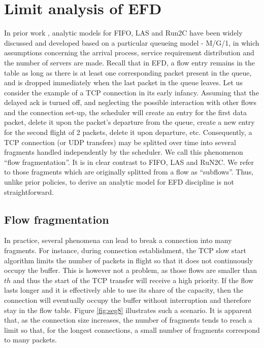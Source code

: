 \documentclass[preprint,12pt]{elsarticle}
\begin{document}
\section{Limit analysis of EFD}
\label{sec:analysis_efd}
In prior work \cite{kleinrock_76_queueing,Avrachenkov04Run2c}, analytic models for FIFO, LAS and Run2C have been widely discussed and developed based on a particular queueing model - M/G/1, in which assumptions concerning the arrival process, service requirement distribution and the number of servers are made. Recall that in EFD, a flow entry remains in the table as long as there is at least one corresponding packet present in the queue, and is dropped immediately when the last packet in the queue leaves. Let us consider the example of a TCP connection in its early infancy. Assuming that the delayed ack is turned off, and neglecting the possible interaction with other flows and the connection set-up, the scheduler will create an entry for the first data packet, delete it upon the packet's departure from the queue, create a new entry for the second flight of 2 packets, delete it upon departure, etc. Consequently, a TCP connection (or UDP transfers) may be splitted over time into several fragments handled independently by the scheduler. We call this phenomenon ``flow fragmentation''. It is in clear contrast to FIFO, LAS and RuN2C. We refer to those fragments which are originally splitted from a flow as ``subflows''. Thus, unlike prior policies, to derive an analytic model for EFD discipline is not straightforward.

\subsection{Flow fragmentation}

In practice, several phenomena can lead to break a connection into many fragments. For instance,  during connection establishment, the TCP slow start algorithm limits the number of packets in flight so that it does not continuously occupy the buffer. This is however not a problem, as those flows are smaller than $th$ and thus the start of the TCP transfer will receive a high priority. If the flow lasts longer and it is effectively able to use its share of the capacity, then the connection will eventually occupy  the buffer without interruption and therefore stay in the flow table. Figure \ref{fig:seg8} illustrates such a scenario. It is apparent that, as the connection size increases, the number of fragments tends to reach a limit so that, for the longest connections, a small number of fragments correspond to many packets.
\end{document}
